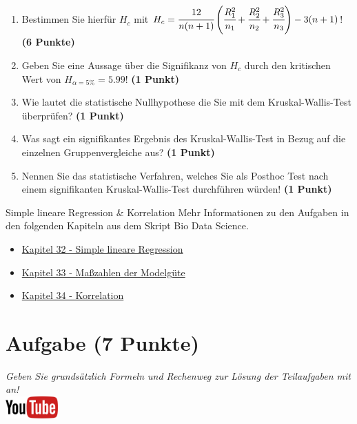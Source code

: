 \documentclass[a4paper, 9pt]{scrartcl}\usepackage[]{graphicx}\usepackage[]{xcolor}
\begin{document}
\begin{enumerate}
\item Bestimmen Sie hierf{\"u}r $H_c$ mit $H_c =
  \cfrac{12}{n(n+1)}\left(\cfrac{R_1^2}{n_1}+\cfrac{R_2^2}{n_2}
    + \cfrac{R_3^2}{n_3}\right)
  - 3(n+1)$! \textbf{(6 Punkte)} 
\item Geben Sie eine Aussage {\"u}ber die Signifikanz von $H_c$ durch
  den kritischen Wert von $H_{\alpha = 5\%} = 5.99$! \textbf{(1 Punkt)}
\item Wie lautet die statistische Nullhypothese die Sie mit dem Kruskal-Wallis-Test
  {\"u}berpr{\"u}fen? \textbf{(1 Punkt)}
\item Was sagt ein signifikantes Ergebnis des Kruskal-Wallis-Test in Bezug
  auf die einzelnen Gruppenvergleiche aus? \textbf{(1 Punkt)}
\item Nennen Sie das statistische Verfahren, welches Sie als Posthoc Test
  nach einem signifikanten Kruskal-Wallis-Test durchf{\"u}hren w{\"u}rden! \textbf{(1 Punkt)}
\end{enumerate} 
\clearpage
\begin{graybox}{Simple lineare Regression \& Korrelation}
Mehr Informationen zu den Aufgaben in den folgenden Kapiteln aus dem Skript Bio Data Science.
  \begin{itemize}
  \item \href{https://jkruppa.github.io/stat-linear-reg-basic.html}{Kapitel 32 - Simple lineare Regression}
  \item \href{https://jkruppa.github.io/stat-linear-reg-quality.html}{Kapitel 33 - Maßzahlen der Modelgüte}
  \item \href{https://jkruppa.github.io/stat-linear-reg-corr.html}{Kapitel 34 - Korrelation}
  \end{itemize}
\end{graybox}
\clearpage

\section{Aufgabe \hfill (7 Punkte)}

\textit{Geben Sie grunds{\"a}tzlich Formeln und Rechenweg zur L{\"o}sung der
  Teilaufgaben mit an!} \\[1Ex]

\hfill\href{https://youtu.be/2dUJcYK9RgU}{\includegraphics[width =
  2cm]{img/youtube}}\\[1Ex]
\end{document}
